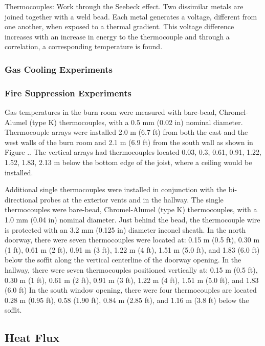 \documentclass[12pt,oneside]{book}
\begin{document}
Thermocouples:
Work through the Seebeck effect.  Two dissimilar metals are joined together with a weld bead.  Each metal generates a voltage, different from one another, when exposed to a thermal gradient.  This voltage difference increases with an increase in energy to the thermocouple and through a correlation, a corresponding temperature is found.  

\subsubsection{Gas Cooling Experiments}
\label{subsubsec:Gas_Cooling_Temperature_Instrumentation}

\subsubsection{Fire Suppression Experiments}
\label{subsubsec:Fire_Suppression_Temperature_Instrumentation}

Gas temperatures in the burn room were measured with bare-bead, Chromel-Alumel (type K) thermocouples, with a 0.5 mm (0.02 in) nominal diameter.  Thermocouple arrays were installed 2.0 m (6.7 ft) from both the east and the west walls of the burn room and 2.1 m (6.9 ft) from the south wall as shown in Figure ..  The vertical arrays had thermocouples located 0.03, 0.3, 0.61, 0.91, 1.22, 1.52, 1.83, 2.13 m below the bottom edge of the joist, where a ceiling would be installed.   

Additional single thermocouples were installed in conjunction with the bi-directional probes at the exterior vents and in the hallway.  The single thermocouples were bare-bead, Chromel-Alumel (type K) thermocouples, with a 1.0 mm (0.04 in) nominal diameter. Just behind the bead, the thermocouple wire is protected with an 3.2 mm (0.125 in) diameter inconel sheath.  
In the north doorway, there were seven thermocouples were located at: 0.15 m (0.5 ft), 0.30 m (1 ft), 0.61 m (2 ft), 0.91 m (3 ft), 1.22 m (4 ft), 1.51 m (5.0 ft), and 1.83 (6.0 ft) below the soffit along the vertical centerline of the doorway opening.  In the hallway, there were seven thermocouples positioned vertically at: 0.15 m (0.5 ft), 0.30 m (1 ft), 0.61 m (2 ft), 0.91 m (3 ft), 1.22 m (4 ft), 1.51 m (5.0 ft), and 1.83 (6.0 ft)   In the south window opening, there were four thermocouples are located 0.28 m (0.95 ft), 0.58 (1.90 ft), 0.84 m (2.85 ft), and 1.16 m (3.8 ft) below the soffit.  

\subsection{Heat Flux}
\label{subsec:Heat_Flux}
\end{document}
